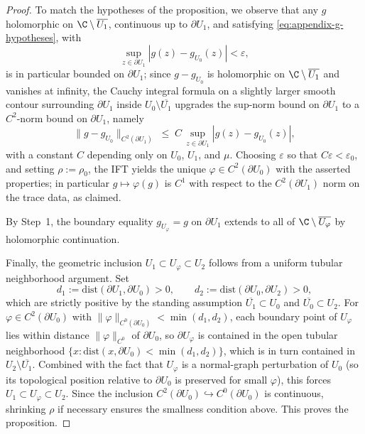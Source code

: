 \begin{proof}
To match the hypotheses of the proposition, we observe that any \(g\)
holomorphic on \(\C\setminus \overline{U_1}\), continuous up to
\(\partial U_1\), and satisfying \eqref{eq:appendix-g-hypotheses}, with
\[
\sup_{z\in\partial U_1}|g(z)-g_{U_0}(z)|<\varepsilon,
\]
is in particular bounded on \(\partial U_1\); since \(g-g_{U_0}\) is
holomorphic on \(\C\setminus \overline{U_1}\) and vanishes at infinity,
the Cauchy integral formula on a slightly larger smooth contour
surrounding \(\partial U_1\) inside \(U_0\setminus \overline{U_1}\)
upgrades the sup-norm bound on \(\partial U_1\) to a \(C^2\)-norm bound
on \(\partial U_1\), namely
\[
\|g-g_{U_0}\|_{C^2(\partial U_1)}\;\leq\;C\,
\sup_{z\in\partial U_1}|g(z)-g_{U_0}(z)|,
\]
with a constant \(C\) depending only on \(U_0\), \(U_1\), and \(\mu\).
Choosing \(\varepsilon\) so that \(C\varepsilon<\varepsilon_0\), and
setting \(\rho:=\rho_0\), the IFT yields the unique
\(\varphi\in C^2(\partial U_0)\) with the asserted properties; in
particular \(g\mapsto\varphi(g)\) is \(C^1\) with respect to the
\(C^2(\partial U_1)\) norm on the trace data, as claimed.

By Step~1, the boundary equality \(g_{U_\varphi}=g\) on \(\partial U_1\)
extends to all of \(\C\setminus \overline{U_\varphi}\) by holomorphic
continuation.

Finally, the geometric inclusion
\(U_1\subset U_\varphi\subset U_2\) follows from a uniform tubular
neighborhood argument. Set
\[
d_1:=\mathrm{dist}(\partial U_1,\partial U_0)>0,\qquad
d_2:=\mathrm{dist}(\partial U_0,\partial U_2)>0,
\]
which are strictly positive by the standing assumption
\(\overline{U_1}\subset U_0\) and \(\overline{U_0}\subset U_2\). For
\(\varphi\in C^2(\partial U_0)\) with
\(\|\varphi\|_{C^0(\partial U_0)}<\min(d_1,d_2)\), each boundary point of
\(U_\varphi\) lies within distance \(\|\varphi\|_{C^0}\) of \(\partial U_0\),
so \(\partial U_\varphi\) is contained in the open tubular neighborhood
\(\{x:\mathrm{dist}(x,\partial U_0)<\min(d_1,d_2)\}\), which is in turn
contained in \(U_2\setminus \overline{U_1}\). Combined with the fact that
\(U_\varphi\) is a normal-graph perturbation of \(U_0\) (so its topological
position relative to \(\partial U_0\) is preserved for small \(\varphi\)),
this forces \(U_1\subset U_\varphi\subset U_2\). Since the inclusion
\(C^2(\partial U_0)\hookrightarrow C^0(\partial U_0)\) is continuous,
shrinking \(\rho\) if necessary ensures the smallness condition above.
This proves the proposition.
\end{proof}


